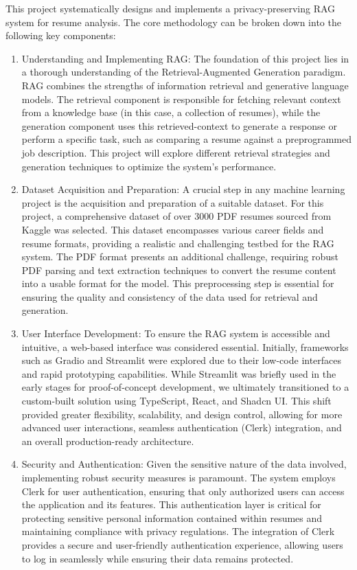 \documentclass[12pt]{report}
\begin{document}
This project systematically designs and implements a privacy-preserving RAG system for resume analysis. The core methodology can be broken down into the following key components:
\begin{enumerate}

    \item Understanding and Implementing RAG: The foundation of this project lies in a thorough understanding of the Retrieval-Augmented Generation paradigm. RAG combines the strengths of information retrieval and generative language models. The retrieval component is responsible for fetching relevant context from a knowledge base (in this case, a collection of resumes), while the generation component uses this retrieved-context to generate a response or perform a specific task, such as comparing a resume against a preprogrammed job description. This project will explore different retrieval strategies and generation techniques to optimize the system's performance.
    \item Dataset Acquisition and Preparation: A crucial step in any machine learning project is the acquisition and preparation of a suitable dataset. For this project, a comprehensive dataset of over 3000 PDF resumes sourced from Kaggle was selected. This dataset encompasses various career fields and resume formats, providing a realistic and challenging testbed for the RAG system. The PDF format presents an additional challenge, requiring robust PDF parsing and text extraction techniques to convert the resume content into a usable format for the model. This preprocessing step is essential for ensuring the quality and consistency of the data used for retrieval and generation.
    \item User Interface Development: To ensure the RAG system is accessible and intuitive, a web-based interface was considered essential. Initially, frameworks such as Gradio and Streamlit were explored due to their low-code interfaces and rapid prototyping capabilities. While Streamlit was briefly used in the early stages for proof-of-concept development, we ultimately transitioned to a custom-built solution using TypeScript, React, and Shadcn UI. This shift provided greater flexibility, scalability, and design control, allowing for more advanced user interactions, seamless authentication (Clerk) integration, and an overall production-ready architecture.
    \item Security and Authentication: Given the sensitive nature of the data involved, implementing robust security measures is paramount. The system employs Clerk for user authentication, ensuring that only authorized users can access the application and its features. This authentication layer is critical for protecting sensitive personal information contained within resumes and maintaining compliance with privacy regulations. The integration of Clerk provides a secure and user-friendly authentication experience, allowing users to log in seamlessly while ensuring their data remains protected.

\end{enumerate}
\end{document}
